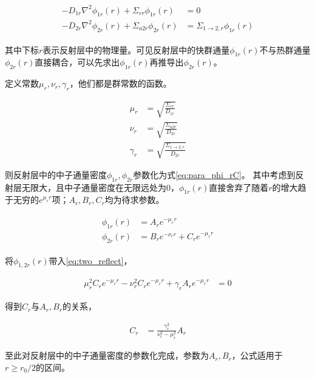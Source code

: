 \begin{align}
    \label{eq:two_reflect}
    \begin{split}
        -D_{1r}\nabla^2\phi_{1r}(r) + \Sigma_{rr}\phi_{1r}(r) &= 0 \\
        -D_{2r}\nabla^2\phi_{2r}(r) + \Sigma_{a2r}\phi_{2r}(r) &= \Sigma_{1\rightarrow 2,r}\phi_{1r}(r)
    \end{split}
\end{align}

其中下标$r$表示反射层中的物理量。可见反射层中的快群通量$\phi_{1r}(r)$不与热群通量$\phi_{2r}(r)$直接耦合，可以先求出$\phi_{1r}(r)$再推导出$\phi_{2r}(r)$。

定义常数$\mu_r,\nu_r,\gamma_r$，他们都是群常数的函数。

\begin{align}
    \mu_r &= \sqrt{\frac{\Sigma_{rr}}{D_{1r}}} \\
    \nu_r &= \sqrt{\frac{\Sigma_{a2r}}{D_{2r}}} \\
    \gamma_r &= \sqrt{\frac{\Sigma_{1\rightarrow 2,r}}{D_{2r}}}
\end{align}

则反射层中的中子通量密度$\phi_{1r},\phi_{2r}$参数化为式\ref{eq:para_phi_rC}。
其中考虑到反射层无限大，且中子通量密度在无限远处为$0$，$\phi_{1r}(r)$直接舍弃了随着$r$的增大趋于无穷的$e^{\mu_r r}$项；$A_r,B_r,C_r$均为待求参数。

\begin{align}
    \label{eq:para_phi_rC}
    \begin{split}
        \phi_{1r}(r) &= A_r e^{-\mu_r r} \\
        \phi_{2r}(r) &= B_r e^{-\nu_r r} + C_r e^{-\mu_r r}
    \end{split}
\end{align}

将$\phi_{1,2r}(r)$带入\ref{eq:two_reflect}，

\begin{align}
    \mu_r^2 C_r e^{-\mu_r r} - \nu_r^2 C_r e^{-\mu_r r} + \gamma_r A_r e^{-\mu_r r} &= 0
\end{align}

得到$C_r$与$A_r,B_r$的关系，

\begin{align}
    C_r &= \frac{\gamma_r^2}{\nu_r^2 - \mu_r^2}A_r
\end{align}

至此对反射层中的中子通量密度的参数化完成，参数为$A_r,B_r$，公式适用于$r \geq r_0/2$的区间。

